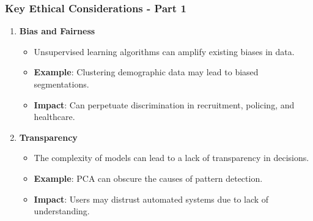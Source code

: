 \documentclass[aspectratio=169]{beamer}
\begin{document}
\begin{frame}[fragile]
  \frametitle{Key Ethical Considerations - Part 1}
  \begin{enumerate}
    \item \textbf{Bias and Fairness}
      \begin{itemize}
        \item Unsupervised learning algorithms can amplify existing biases in data.
        \item \textbf{Example}: Clustering demographic data may lead to biased segmentations.
        \item \textbf{Impact}: Can perpetuate discrimination in recruitment, policing, and healthcare.
      \end{itemize}
    
    \item \textbf{Transparency}
      \begin{itemize}
        \item The complexity of models can lead to a lack of transparency in decisions.
        \item \textbf{Example}: PCA can obscure the causes of pattern detection.
        \item \textbf{Impact}: Users may distrust automated systems due to lack of understanding.
      \end{itemize}
  \end{enumerate}
\end{frame}
\end{document}
